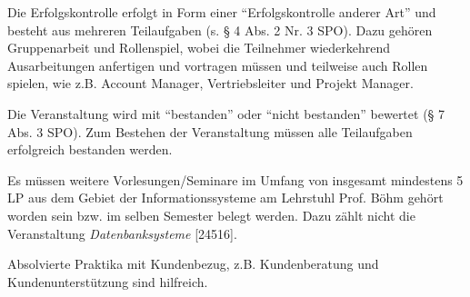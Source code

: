 \begin{course}

\setdoclanguagegerman
{}



\coursehead


\label{cour_7139.dp_997}


\begin{styleenv}
\begin{assessment}
Die Erfolgskontrolle erfolgt in Form einer “Erfolgskontrolle anderer Art” und besteht aus mehreren Teilaufgaben (s. § 4 Abs. 2 Nr. 3 SPO). Dazu gehören Gruppenarbeit und Rollenspiel, wobei die Teilnehmer wiederkehrend Ausarbeitungen anfertigen und vortragen müssen und teilweise auch Rollen spielen, wie z.B. Account Manager, Vertriebsleiter und Projekt Manager.

 

Die Veranstaltung wird mit “bestanden” oder “nicht bestanden” bewertet (§ 7 Abs. 3 SPO). Zum Bestehen der Veranstaltung müssen alle Teilaufgaben erfolgreich bestanden werden.


\end{assessment}

\begin{conditions}Es müssen weitere Vorlesungen/Seminare im Umfang von insgesamt mindestens 5 LP aus dem Gebiet der Informationssysteme am Lehrstuhl Prof. Böhm gehört worden sein bzw. im selben Semester belegt werden. Dazu zählt nicht die Veranstaltung \emph{Datenbanksysteme} [24516].

\end{conditions}

\begin{recommendations}Absolvierte Praktika mit Kundenbezug, z.B. Kundenberatung und Kundenunterstützung sind hilfreich.

\end{recommendations}
\end{styleenv}


\end{course}
